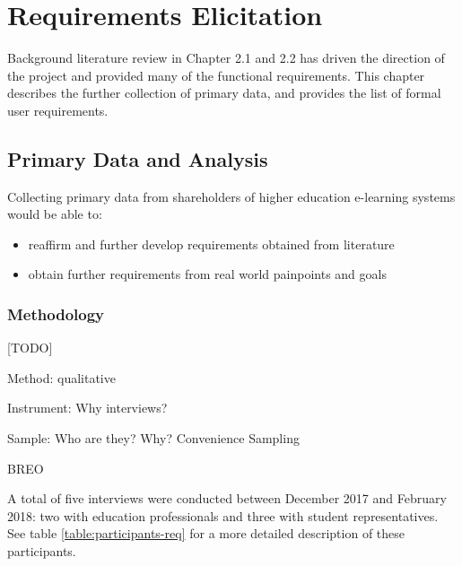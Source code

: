 \chapter{Requirements Elicitation}
\graphicspath{{Chapter4/Figs/Raster/}{Chapter4/Figs/}}

Background literature review in Chapter 2.1 and 2.2 has driven the direction of the project and 
provided many of the functional requirements. This chapter describes the further collection of primary 
data, and provides the list of formal user requirements.

\section{Primary Data and Analysis}
Collecting primary data from shareholders of higher education e-learning systems would be able to:
\begin{itemize}
    \item reaffirm and further develop requirements obtained from literature
    \item obtain further requirements from real world painpoints and goals
\end{itemize}

\subsection{Methodology}

[TODO]

Method: qualitative

Instrument: Why interviews?

Sample: Who are they? Why? Convenience Sampling

BREO

A total of five interviews were conducted between December 2017 and February 2018: 
two with education professionals and three with student representatives. See table 
\ref{table:participants-req} for a more detailed description of these participants.

